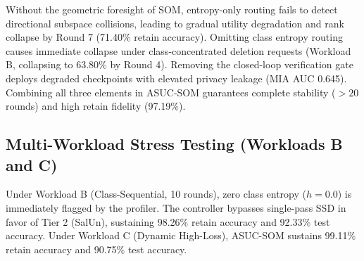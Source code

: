 \documentclass[conference]{IEEEtran}
\begin{document}
\begin{table}[htbp]
\caption{Systematic Component Ablation Study (20 Rounds)}
\label{tab:ablation}
\centering
{}
\end{table}

Without the geometric foresight of SOM, entropy-only routing fails to detect directional subspace collisions, leading to gradual utility degradation and rank collapse by Round 7 (71.40\% retain accuracy). Omitting class entropy routing causes immediate collapse under class-concentrated deletion requests (Workload B, collapsing to 63.80\% by Round 4). Removing the closed-loop verification gate deploys degraded checkpoints with elevated privacy leakage (MIA AUC 0.645). Combining all three elements in ASUC-SOM guarantees complete stability ($>20$ rounds) and high retain fidelity (97.19\%).

\subsection{Multi-Workload Stress Testing (Workloads B and C)}
Under Workload B (Class-Sequential, 10 rounds), zero class entropy ($h = 0.0$) is immediately flagged by the profiler. The controller bypasses single-pass SSD in favor of Tier 2 (SalUn), sustaining 98.26\% retain accuracy and 92.33\% test accuracy. Under Workload C (Dynamic High-Loss), ASUC-SOM sustains 99.11\% retain accuracy and 90.75\% test accuracy.
\end{document}
